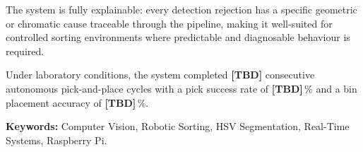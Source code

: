 \vspace{0.4cm}

The system is fully explainable: every detection rejection has a specific 
geometric or chromatic cause traceable through the pipeline, making it 
well-suited for controlled sorting environments where predictable and 
diagnosable behaviour is required.

\vspace{0.4cm}

Under laboratory conditions, the system completed
\textbf{[TBD]} consecutive autonomous pick-and-place cycles
with a pick success rate of \textbf{[TBD]}\,\% and a bin
placement accuracy of \textbf{[TBD]}\,\%.

\vspace{1cm}

\noindent\textbf{Keywords:} Computer Vision, Robotic Sorting, HSV Segmentation, 
Real-Time Systems, Raspberry Pi.

\clearpage